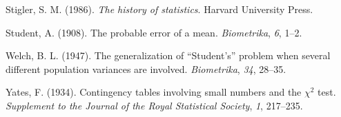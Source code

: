 \documentclass[
]{book}
\newlength{\cslhangindent}
\newlength{\cslentryspacingunit} %
\newenvironment{CSLReferences}[2] %
 {%
  \setlength{\parindent}{0pt}
  \ifodd #1
  \let\oldpar\par
  \def\par{\hangindent=\cslhangindent\oldpar}
  \fi
  \setlength{\parskip}{#2\cslentryspacingunit}
 }%
 {}
\theoremstyle{definition}
\theoremstyle{definition}
\theoremstyle{definition}
\theoremstyle{definition}
\theoremstyle{remark}
\begin{document}
\begin{CSLReferences}{1}{0}
\leavevmode{}%
Stigler, S. M. (1986). \emph{The history of statistics}. Harvard University Press.

\leavevmode{}%
Student, A. (1908). The probable error of a mean. \emph{Biometrika}, \emph{6}, 1--2.

\leavevmode{}%
Welch, B. L. (1947). The generalization of {``{S}tudent's''} problem when several different population variances are involved. \emph{Biometrika}, \emph{34}, 28--35.

\leavevmode{}%
Yates, F. (1934). Contingency tables involving small numbers and the \(\chi^2\) test. \emph{Supplement to the Journal of the Royal Statistical Society}, \emph{1}, 217--235.

\end{CSLReferences}
\end{document}
